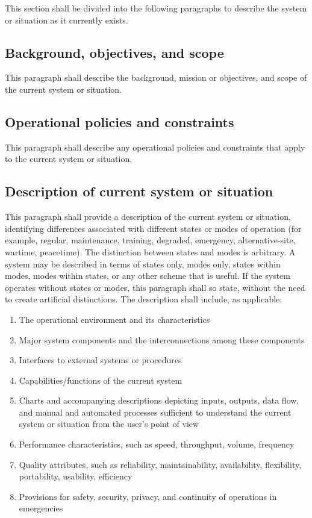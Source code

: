 \documentclass{fidata-report-template}
\begin{document}
This section shall be divided into the following paragraphs to describe
the system or situation as it currently exists.

\subsection{Background, objectives, and scope}

This paragraph shall describe the background, mission or objectives, and
scope of the current system or situation.

\subsection{Operational policies and constraints}

This paragraph shall describe any operational policies and constraints
that apply to the current system or situation.

\subsection{Description of current system or situation}

This paragraph shall provide a description of the current system or
situation, identifying differences associated with different states or
modes of operation (for example, regular, maintenance, training,
degraded, emergency, alternative-site, wartime, peacetime). The
distinction between states and modes is arbitrary. A system may be
described in terms of states only, modes only, states within modes,
modes within states, or any other scheme that is useful. If the system
operates without states or modes, this paragraph shall so state, without
the need to create artificial distinctions. The description shall
include, as applicable:

\begin{enumerate}
\itemsep1pt\parskip0pt
\item
  The operational environment and its characteristics
\item
  Major system components and the interconnections among these
  components
\item
  Interfaces to external systems or procedures
\item
  Capabilities/functions of the current system
\item
  Charts and accompanying descriptions depicting inputs, outputs, data
  flow, and manual and automated processes sufficient to understand the
  current system or situation from the user's point of view
\item
  Performance characteristics, such as speed, throughput, volume,
  frequency
\item
  Quality attributes, such as reliability, maintainability,
  availability, flexibility, portability, usability, efficiency
\item
  Provisions for safety, security, privacy, and continuity of operations
  in emergencies
\end{enumerate}
\end{document}
